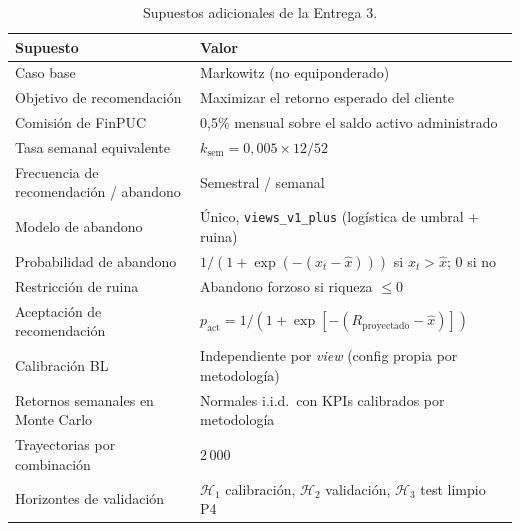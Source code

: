 \begin{table}[h]
\centering
\caption{Supuestos adicionales de la Entrega 3.}
\label{tab:supuestos_e3}
\scriptsize
\begin{tabular}{@{}ll@{}}
\toprule
Supuesto & Valor \\
\midrule
Caso base & Markowitz (no equiponderado) \\
Objetivo de recomendaci\'on & Maximizar el retorno esperado del cliente \\
Comisi\'on de FinPUC & 0,5\% mensual sobre el saldo activo administrado \\
Tasa semanal equivalente & $k_{\text{sem}} = 0{,}005 \times 12/52$ \\
Frecuencia de recomendaci\'on / abandono & Semestral / semanal \\
Modelo de abandono & \'Unico, \texttt{views\_v1\_plus} (log\'istica de umbral + ruina) \\
Probabilidad de abandono & $1/(1+\exp(-(x_t-\hat{x})))$ si $x_t>\hat{x}$; $0$ si no \\
Restricci\'on de ruina & Abandono forzoso si riqueza $\leq 0$ \\
Aceptaci\'on de recomendaci\'on & $p_{\text{act}}=1/(1+\exp[-(R_{\text{proyectado}}-\hat{x})])$ \\
Calibraci\'on BL & Independiente por \textit{view} (config propia por metodolog\'ia) \\
Retornos semanales en Monte Carlo & Normales i.i.d.\ con KPIs calibrados por metodolog\'ia \\
Trayectorias por combinaci\'on & 2\,000 \\
Horizontes de validaci\'on & $\mathcal{H}_1$ calibraci\'on, $\mathcal{H}_2$ validaci\'on, $\mathcal{H}_3$ test limpio P4 \\
\bottomrule
\end{tabular}
\end{table}
